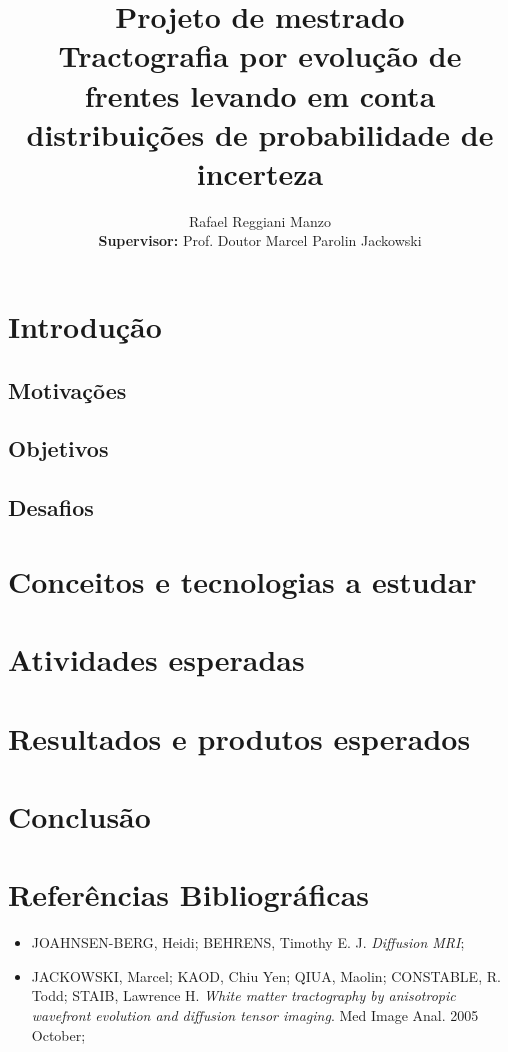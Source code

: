 \documentclass[a4paper,11pt]{report}
\title{Projeto de mestrado\\
       \textbf{Tractografia por evolução de frentes levando em conta distribuições de probabilidade de incerteza}}
\author{Rafael Reggiani Manzo\\
        \textbf{Supervisor:} Prof. Doutor Marcel Parolin Jackowski}
\begin{document}
\maketitle
\tableofcontents

\begin{abstract}
\end{abstract}

\chapter{Introdução}
  \section{Motivações}
  
  
  \section{Objetivos}
  \section{Desafios}

\chapter{Conceitos e tecnologias a estudar}

\chapter{Atividades esperadas}

\chapter{Resultados e produtos esperados}

\chapter{Conclusão}

\chapter{Referências Bibliográficas}

\begin{itemize}
  \item JOAHNSEN-BERG, Heidi; BEHRENS, Timothy E. J. \textit{Diffusion MRI};
  \item JACKOWSKI, Marcel; KAOD, Chiu Yen; QIUA, Maolin; CONSTABLE, R. Todd; STAIB, Lawrence H. \textit{White matter tractography by anisotropic wavefront evolution and diffusion tensor imaging}. Med Image Anal. 2005 October;
\end{itemize}
\end{document}
